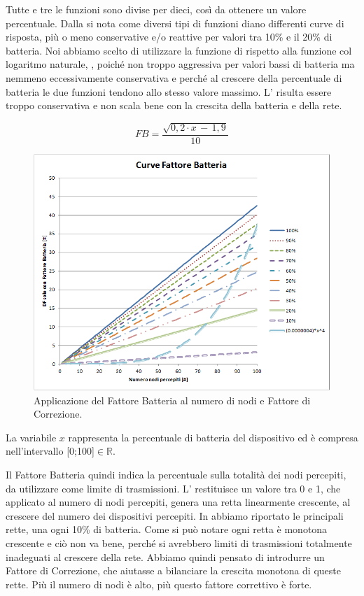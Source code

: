 Tutte e tre le funzioni sono divise per dieci, così da ottenere un valore percentuale. Dalla  si nota come diversi tipi di funzioni diano differenti curve di risposta, più o meno conservative e/o reattive per valori tra 10\% e il 20\% di batteria. Noi abbiamo scelto di utilizzare la funzione di  rispetto alla funzione col logaritmo naturale, , poiché non troppo aggressiva per valori bassi di batteria ma nemmeno eccessivamente conservativa e perché al crescere della percentuale di batteria le due funzioni tendono allo stesso valore massimo. L' risulta essere troppo conservativa e non scala bene con la crescita della batteria e della rete.
\medskip

\begin{equation}
	\label{eq:df_FB}
	FB = \dfrac{\sqrt{0,2\cdot x\,-\,1,9}}{10}
\end{equation}
\begin{figure}[tb]
	\centering
	\includegraphics[width=0.9\linewidth]{Images/grafici_usati/DF_curve_fattore_batteria_corr}
	\caption[Curve Fattore Batteria con Fattore di Correzione]{Applicazione del Fattore Batteria al numero di nodi e Fattore di Correzione.}
	\label{fig:DF_curve_fattore_batteria_corr}
\end{figure}
La variabile $\textit{x}$ rappresenta la percentuale di batteria del dispositivo ed è compresa nell'intervallo [0;100]$\in\mathbb{R}$.

Il Fattore Batteria quindi indica la percentuale sulla totalità dei nodi percepiti, da utilizzare come limite di trasmissioni. L' restituisce un valore tra 0 e 1, che applicato al numero di nodi percepiti, genera una retta linearmente crescente, al crescere del numero dei dispositivi percepiti. In  abbiamo riportato le principali rette, una ogni 10\% di batteria. Come si può notare ogni retta è monotona crescente e ciò non va bene, perché si avrebbero limiti di trasmissioni totalmente inadeguati al crescere della rete. Abbiamo quindi pensato di introdurre un Fattore di Correzione, che aiutasse a bilanciare la crescita monotona di queste rette. Più il numero di nodi è alto, più questo fattore correttivo è forte.
\medskip

